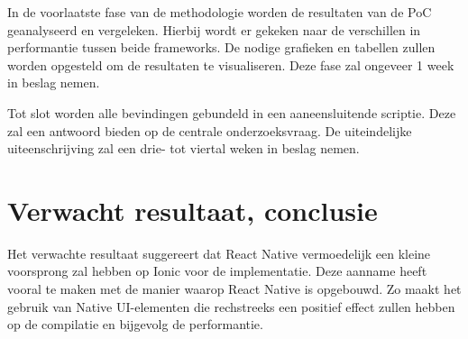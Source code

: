 In de voorlaatste fase van de methodologie worden de resultaten van de PoC geanalyseerd en vergeleken. Hierbij wordt er gekeken naar de verschillen in performantie tussen beide frameworks. De nodige grafieken en tabellen zullen worden opgesteld om de resultaten te visualiseren. Deze fase zal ongeveer 1 week in beslag nemen.

Tot slot worden alle bevindingen gebundeld in een aaneensluitende scriptie. Deze zal een antwoord bieden op de centrale onderzoeksvraag. De uiteindelijke uiteenschrijving zal een drie- tot viertal weken in beslag nemen.

\section{Verwacht resultaat, conclusie}%
\label{sec:verwachte_resultaten}

Het verwachte resultaat suggereert dat React Native vermoedelijk een kleine voorsprong zal hebben op Ionic voor de implementatie. Deze aanname heeft vooral te maken met de manier waarop React Native is opgebouwd. Zo maakt het gebruik van Native UI-elementen die rechstreeks een positief effect zullen hebben op de compilatie en bijgevolg de performantie. 

